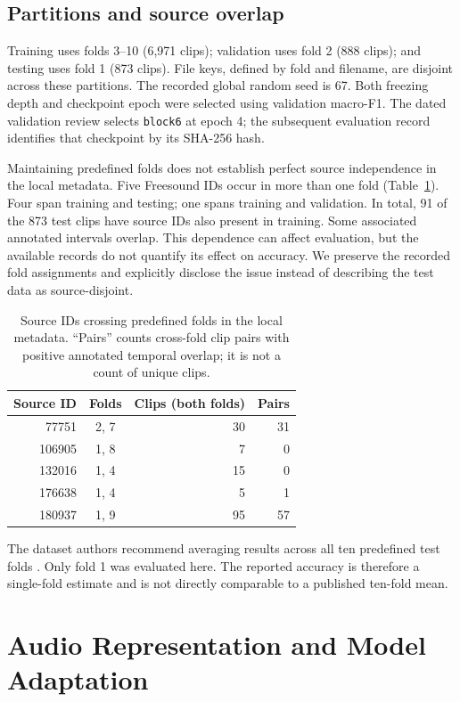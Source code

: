 \documentclass[conference]{IEEEtran}
\newcommand{\code}[1]{\texttt{#1}}
\begin{document}
\subsection{Partitions and source overlap}
Training uses folds 3--10 (6,971 clips); validation uses fold 2 (888 clips); and testing uses fold 1 (873 clips). File keys, defined by fold and filename, are disjoint across these partitions. The recorded global random seed is 67. Both freezing depth and checkpoint epoch were selected using validation macro-F1. The dated validation review selects \code{block6} at epoch 4; the subsequent evaluation record identifies that checkpoint by its SHA-256 hash.

Maintaining predefined folds does not establish perfect source independence in the local metadata. Five Freesound IDs occur in more than one fold (Table~\ref{tab:overlap}). Four span training and testing; one spans training and validation. In total, 91 of the 873 test clips have source IDs also present in training. Some associated annotated intervals overlap. This dependence can affect evaluation, but the available records do not quantify its effect on accuracy. We preserve the recorded fold assignments and explicitly disclose the issue instead of describing the test data as source-disjoint.

\begin{table}[t]
\centering\caption{Source IDs crossing predefined folds in the local metadata. ``Pairs'' counts cross-fold clip pairs with positive annotated temporal overlap; it is not a count of unique clips.}\label{tab:overlap}
\footnotesize
\begin{tabular}{@{}r c r r@{}}\toprule
Source ID & Folds & Clips (both folds) & Pairs\\\midrule
77751 & 2, 7 & 30 & 31\\
106905 & 1, 8 & 7 & 0\\
132016 & 1, 4 & 15 & 0\\
176638 & 1, 4 & 5 & 1\\
180937 & 1, 9 & 95 & 57\\\bottomrule
\end{tabular}
\end{table}

The dataset authors recommend averaging results across all ten predefined test folds \cite{urbansoundwebsite}. Only fold 1 was evaluated here. The reported accuracy is therefore a single-fold estimate and is not directly comparable to a published ten-fold mean.

\section{Audio Representation and Model Adaptation}\label{sec:model}
\end{document}
